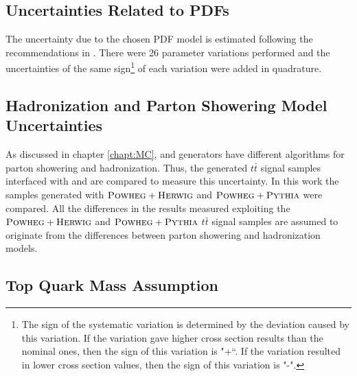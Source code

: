 \subsection{Uncertainties Related to PDFs}

The uncertainty due to the chosen PDF model is estimated following the recommendations in \cite{Lai:2010vv}. There were 26 parameter variations
performed and the uncertainties of the same sign\footnote{The sign of the systematic variation is determined by the deviation caused by this
variation. If the variation gave higher cross section results than the nominal ones, then the sign of this variation is "+``. If the variation 
resulted in lower cross section values, then the sign of this variation is "-".} of each variation were added in quadrature.

% 

\subsection{Hadronization and Parton Showering Model Uncertainties}

As discussed in chapter \ref{chapt:MC}, \PYTHIA and \HERWIG generators have different algorithms for parton showering and hadronization.
Thus, the generated $t\bar{t}$ signal samples interfaced with \PYTHIA and \HERWIG are compared to measure this uncertainty. In this work
the samples generated with $\textsc{Powheg}+\textsc{Herwig}$ and $\textsc{Powheg}+\textsc{Pythia}$ were compared. All the differences in the results measured exploiting the
$\textsc{Powheg}+\textsc{Herwig}$ and $\textsc{Powheg}+\textsc{Pythia}$ $t\bar{t}$ signal samples are assumed to originate from the differences between parton showering
and hadronization models.

\subsection{Top Quark Mass Assumption}

